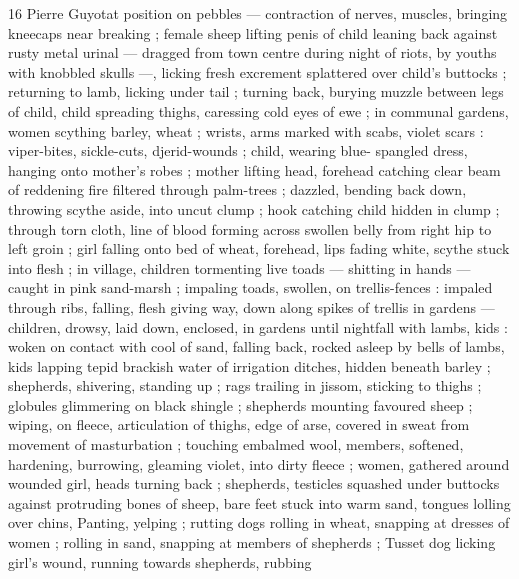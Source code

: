 16 Pierre Guyotat
position on pebbles — contraction of nerves, muscles, bringing
kneecaps near breaking ; female sheep lifting penis of child leaning
back against rusty metal urinal — dragged from town centre during
night of riots, by youths with knobbled skulls —, licking fresh
excrement splattered over child's buttocks ; returning to lamb, licking
under tail ; turning back, burying muzzle between legs of child, child
spreading thighs, caressing cold eyes of ewe ; in communal gardens,
women scything barley, wheat ; wrists, arms marked with scabs, violet
scars : viper-bites, sickle-cuts, djerid-wounds ; child, wearing blue-
spangled dress, hanging onto mother's robes ; mother lifting head,
forehead catching clear beam of reddening fire filtered through
palm-trees ; dazzled, bending back down, throwing scythe aside, into
uncut clump ; hook catching child hidden in clump ; through torn
cloth, line of blood forming across swollen belly from right hip to left
groin ; girl falling onto bed of wheat, forehead, lips fading white,
scythe stuck into flesh ; in village, children tormenting live toads —
shitting in hands — caught in pink sand-marsh ; impaling toads,
swollen, on trellis-fences : impaled through ribs, falling, flesh giving
way, down along spikes of trellis in gardens — children, drowsy, laid
down, enclosed, in gardens until nightfall with lambs, kids : woken on
contact with cool of sand, falling back, rocked asleep by bells of
lambs, kids lapping tepid brackish water of irrigation ditches, hidden
beneath barley ; shepherds, shivering, standing up ; rags trailing in
jissom, sticking to thighs ; globules glimmering on black shingle ;
shepherds mounting favoured sheep ; wiping, on fleece, articulation
of thighs, edge of arse, covered in sweat from movement of
masturbation ; touching embalmed wool, members, softened,
hardening, burrowing, gleaming violet, into dirty fleece ; women,
gathered around wounded girl, heads turning back ; shepherds,
testicles squashed under buttocks against protruding bones of
sheep, bare feet stuck into warm sand, tongues lolling over chins,
Panting, yelping ; rutting dogs rolling in wheat, snapping at dresses
of women ; rolling in sand, snapping at members of shepherds ;
Tusset dog licking girl's wound, running towards shepherds, rubbing


